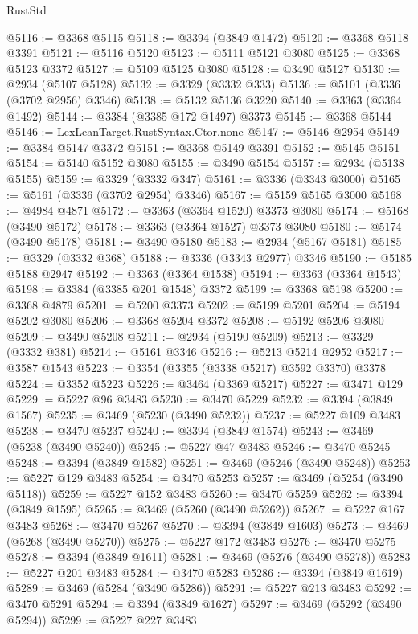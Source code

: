 \begin{lexlean}{RustStd}
\begin{coremodule}
@5116 := @3368 @5115
@5118 := @3394 (@3849 @1472)
@5120 := @3368 @5118 @3391
@5121 := @5116 @5120
@5123 := @5111 @5121 @3080
@5125 := @3368 @5123 @3372
@5127 := @5109 @5125 @3080
@5128 := @3490 @5127
@5130 := @2934 (@5107 @5128)
@5132 := @3329 (@3332 @333)
@5136 := @5101 (@3336 (@3702 @2956) @3346)
@5138 := @5132 @5136 @3220
@5140 := @3363 (@3364 @1492)
@5144 := @3384 (@3385 @172 @1497) @3373
@5145 := @3368 @5144
@5146 := LexLeanTarget.RustSyntax.Ctor.none
@5147 := @5146 @2954
@5149 := @3384 @5147 @3372
@5151 := @3368 @5149 @3391
@5152 := @5145 @5151
@5154 := @5140 @5152 @3080
@5155 := @3490 @5154
@5157 := @2934 (@5138 @5155)
@5159 := @3329 (@3332 @347)
@5161 := @3336 (@3343 @3000)
@5165 := @5161 (@3336 (@3702 @2954) @3346)
@5167 := @5159 @5165 @3000
@5168 := @4984 @4871
@5172 := @3363 (@3364 @1520) @3373 @3080
@5174 := @5168 (@3490 @5172)
@5178 := @3363 (@3364 @1527) @3373 @3080
@5180 := @5174 (@3490 @5178)
@5181 := @3490 @5180
@5183 := @2934 (@5167 @5181)
@5185 := @3329 (@3332 @368)
@5188 := @3336 (@3343 @2977) @3346
@5190 := @5185 @5188 @2947
@5192 := @3363 (@3364 @1538)
@5194 := @3363 (@3364 @1543)
@5198 := @3384 (@3385 @201 @1548) @3372
@5199 := @3368 @5198
@5200 := @3368 @4879
@5201 := @5200 @3373
@5202 := @5199 @5201
@5204 := @5194 @5202 @3080
@5206 := @3368 @5204 @3372
@5208 := @5192 @5206 @3080
@5209 := @3490 @5208
@5211 := @2934 (@5190 @5209)
@5213 := @3329 (@3332 @381)
@5214 := @5161 @3346
@5216 := @5213 @5214 @2952
@5217 := @3587 @1543
@5223 := @3354 (@3355 (@3338 @5217) @3592 @3370) @3378
@5224 := @3352 @5223
@5226 := @3464 (@3369 @5217)
@5227 := @3471 @129
@5229 := @5227 @96 @3483
@5230 := @3470 @5229
@5232 := @3394 (@3849 @1567)
@5235 := @3469 (@5230 (@3490 @5232))
@5237 := @5227 @109 @3483
@5238 := @3470 @5237
@5240 := @3394 (@3849 @1574)
@5243 := @3469 (@5238 (@3490 @5240))
@5245 := @5227 @47 @3483
@5246 := @3470 @5245
@5248 := @3394 (@3849 @1582)
@5251 := @3469 (@5246 (@3490 @5248))
@5253 := @5227 @129 @3483
@5254 := @3470 @5253
@5257 := @3469 (@5254 (@3490 @5118))
@5259 := @5227 @152 @3483
@5260 := @3470 @5259
@5262 := @3394 (@3849 @1595)
@5265 := @3469 (@5260 (@3490 @5262))
@5267 := @5227 @167 @3483
@5268 := @3470 @5267
@5270 := @3394 (@3849 @1603)
@5273 := @3469 (@5268 (@3490 @5270))
@5275 := @5227 @172 @3483
@5276 := @3470 @5275
@5278 := @3394 (@3849 @1611)
@5281 := @3469 (@5276 (@3490 @5278))
@5283 := @5227 @201 @3483
@5284 := @3470 @5283
@5286 := @3394 (@3849 @1619)
@5289 := @3469 (@5284 (@3490 @5286))
@5291 := @5227 @213 @3483
@5292 := @3470 @5291
@5294 := @3394 (@3849 @1627)
@5297 := @3469 (@5292 (@3490 @5294))
@5299 := @5227 @227 @3483

\end{coremodule}
\end{lexlean}
